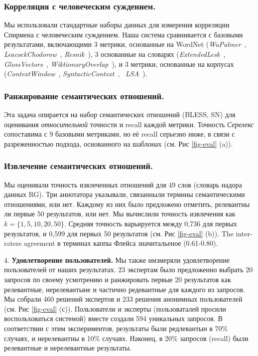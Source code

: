 \documentclass[a4paper,10pt,twoside]{article}
\begin{document}
\subsubsection{Корреляция с человеческим суждением.} Мы использовали стандартные наборы данных для измерения корреляции Спирмена с человеческим суждением. Наша система сравнивается с базовыми результатами, включающими 3 метрики, основанные на WordNet (\textit{WuPalmer}~\cite{wu1994verbs}, \textit{LeacockChodorow}~\cite{leacock1998}, \textit{Resnik}~\cite{resnik1995}), 3 основанные на словарях (\textit{ExtendedLesk}~\cite{banerjee2003extended}, \textit{GlossVectors}~\cite{patwardhan2006using}, \textit{WiktionaryOverlap}~\cite{zesch2008extracting}), и 3 метрики, основанные на корпусах (\textit{ContextWindow}~\cite{cruys2010mining}, \textit{SyntacticContext}~\cite{cruys2010mining}, ~\textit{LSA}~\cite{landauer1998introduction}).

\subsubsection{Ранжирование семантических отношений.} Эта задача опирается на набор семантических отношений (BLESS,  SN) для оценивания \textit{относительной} точности и recall каждой метрики. Точность \textit{Серелекс}  сопоставима с 9 базовыми метриками, но её recall серьезно ниже, в связи с разреженностью подхода, основанного на шаблонах (см. Рис \ref{fig-eval} (a)).

\subsubsection{Извлечение семантических отношений.} Мы оценивали точность извлеченных отношений для 49 слов (словарь надора данных RG). Три аннотатора указывали, связанныли термины семантическими отношениями, или нет. Каждому из них было предложено отметить, релевантны ли первые 50 результатов, или нет. Мы вычислили точность извлечения как $k = \{1, 5, 10, 20, 50\}$. Средняя точность варьируется между 0,736 для первых результатов, и 0,599 для первых 50 результатов (см. Рис \ref{fig-eval} (b)). The inter-raters agreement в терминах каппы Флейса значитальеное (0.61-0.80).


4. \textbf{Удовлетворение пользователей.} Мы также имзмеряли удовлетворение пользователей от наших результатах. 23 экспертам было предложенно выбрать 20 запросов по своему усмотрению и ранжировать первые 20 результатов как релевантные, нерелевантыне и частично редевантные для каждого из запросов. Мы собрали 460 решений экспертов и 233 решения анонимных пользователей (см. Рис \ref{fig-eval} (с)). Пользователи и эксперты (пользоваталей просили воспольховаться системой) вместе создали 594 уникальных запросов. В соответствии с этим экспериментов, результаты были редлевантын  в 70\% случаях, и нерелевантны в 10\% случаях. Наконец, в 20\% запросов (recall) были релевантные и нерелевантные результаты. 
\end{document}
